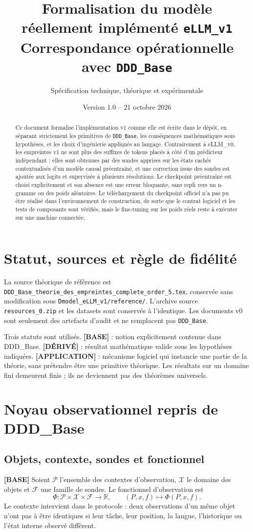 \documentclass[11pt,a4paper]{article}
\title{Formalisation du modèle réellement implémenté \texttt{eLLM\_v1}\\\large Correspondance opérationnelle avec \texttt{DDD\_Base}}
\author{Spécification technique, théorique et expérimentale}
\date{Version 1.0 -- 21 octobre 2026}
\newcommand{\R}{\mathbb R}\newcommand{\X}{\mathcal X}\newcommand{\Pctx}{\mathcal P}\newcommand{\F}{\mathcal F}\newcommand{\Lobs}{\mathcal L}\newcommand{\Cl}{\operatorname{Cl}}\newcommand{\Aff}{\operatorname{Aff}}\newcommand{\rank}{\operatorname{rank}}\newcommand{\softmax}{\operatorname{softmax}}\newcommand{\CE}{\operatorname{CE}}\newcommand{\supp}{\operatorname{supp}}
\begin{document}
\maketitle
\begin{abstract}
Ce document formalise l'implémentation v1 comme elle est écrite dans le dépôt, en séparant strictement les primitives de \texttt{DDD\_Base}, les conséquences mathématiques sous hypothèses, et les choix d'ingénierie appliqués au langage. Contrairement à eLLM\_v0, les empreintes v1 ne sont plus des suffixes de tokens placés à côté d'un prédicteur indépendant : elles sont obtenues par des sondes apprises sur les états cachés contextualisés d'un modèle causal préentraîné, et une correction issue des sondes est ajoutée aux logits et supervisée à plusieurs résolutions. Le checkpoint préentraîné est choisi explicitement et son absence est une erreur bloquante, sans repli vers un n-gramme ou des poids aléatoires. Le téléchargement du checkpoint officiel n'a pas pu être réalisé dans l'environnement de construction, de sorte que le contrat logiciel et les tests de composants sont vérifiés, mais le fine-tuning sur les poids réels reste à exécuter sur une machine connectée.
\end{abstract}
\tableofcontents

\section{Statut, sources et règle de fidélité}
La source théorique de référence est \texttt{DDD\_Base\_theorie\_des\_empreintes\_complete\_order\_5.tex}, conservée sans modification sous \texttt{Dmodel\_eLLM\_v1/reference/}. L'archive source \texttt{resources\_0.zip} et les datasets sont conservés à l'identique. Les documents v0 sont seulement des artefacts d'audit et ne remplacent pas \texttt{DDD\_Base}.

Trois statuts sont utilisés. \textbf{[BASE]} : notion explicitement contenue dans DDD\_Base. \textbf{[DÉRIVÉ]} : résultat mathématique valide sous les hypothèses indiquées. \textbf{[APPLICATION]} : mécanisme logiciel qui instancie une partie de la théorie, sans prétendre être une primitive théorique. Les résultats sur un domaine fini demeurent finis ; ils ne deviennent pas des théorèmes universels.

\section{Noyau observationnel repris de DDD\_Base}
\subsection{Objets, contexte, sondes et fonctionnel}
\textbf{[BASE]} Soient \(\Pctx\) l'ensemble des contextes d'observation, \(\X\) le domaine des objets et \(\F\) une famille de sondes. Le fonctionnel d'observation est
\[
\Phi:\Pctx\times\X\times\F\longrightarrow\R,\qquad (P,x,f)\mapsto\Phi(P,x,f).
\]
Le contexte intervient dans le protocole : deux observations d'un même objet n'ont pas à être identiques si leur tâche, leur position, la langue, l'historique ou l'état interne observé diffèrent.
\end{document}

